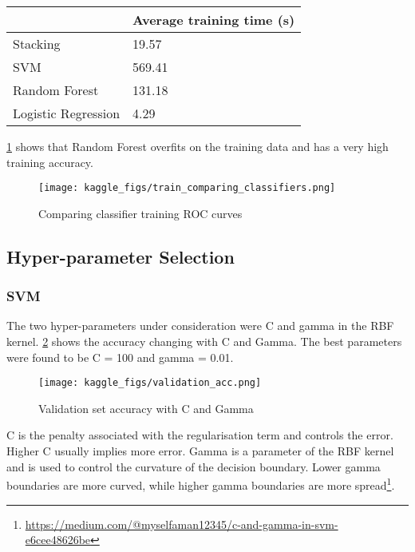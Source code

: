 \documentclass[12pt]{article}
\theoremstyle{definition}
\begin{document}
\begin{center}
\begin{tabular}{|l|l|}
\hline
                    & Average training time (s) \\ \hline
Stacking            & 19.57                     \\ \hline
SVM                 & 569.41                    \\ \hline
Random Forest       & 131.18                    \\ \hline
Logistic Regression & 4.29                      \\ \hline
\end{tabular}
\end{center}
\ref{fig:train-compare} shows that Random Forest overfits on the training data and has a very high training accuracy. 
\begin{figure}[!htbp]
    \centering
    \texttt{[image: kaggle\_figs/train\_comparing\_classifiers.png]}
    \caption{Comparing classifier training ROC curves}
    \label{fig:train-compare}
\end{figure}


\subsection{Hyper-parameter Selection}
\subsubsection{SVM}
The two hyper-parameters under consideration were C and gamma in the RBF kernel. \ref{fig:val_acc} shows the accuracy changing with C and Gamma. The best parameters were found to be C = 100 and gamma = 0.01.\\



\begin{figure}[h]
    \centering
    \texttt{[image: kaggle\_figs/validation\_acc.png]}
    \caption{Validation set accuracy with C and Gamma}
    \label{fig:val_acc}
\end{figure}
C is the penalty associated with the regularisation term and controls the error. Higher C usually implies more error. Gamma is a parameter of the RBF kernel and is used to control the curvature of the decision boundary. Lower gamma boundaries are more curved, while higher gamma boundaries are more spread\footnote{\url{https://medium.com/@myselfaman12345/c-and-gamma-in-svm-e6cee48626be}}. 
\end{document}
